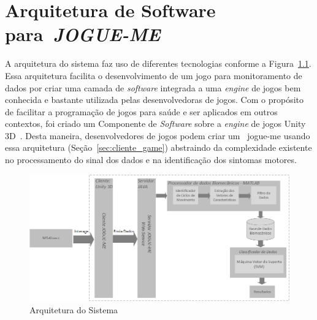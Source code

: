 \chapter{Arquitetura de Software para~\textit{JOGUE-ME}}\label{chapter:arquitetura_captura}

A arquitetura do sistema faz uso de diferentes tecnologias conforme a Figura~\ref{fig:arquitetura}. Essa arquitetura facilita o desenvolvimento de um jogo para monitoramento de dados por criar uma camada de \textit{software} integrada a uma \textit{engine} de jogos bem conhecida e bastante utilizada pelas desenvolvedoras de jogos. Com o propósito de facilitar a programação de jogos para saúde e ser aplicados em outros contextos, foi criado um Componente de \textit{Software} sobre a \textit{engine} de jogos Unity 3D~\cite{unity3d}. Desta maneira, desenvolvedores de jogos podem criar um ~\ac{jogue-me} usando essa arquitetura (Seção~\ref{sec:cliente_game}) abstraindo da complexidade existente no processamento do sinal dos dados e na identificação dos sintomas motores.



\begin{figure}[!htbp]
 \centering
  \includegraphics[scale=0.56]{./img/arquitetura.png}
\caption[Arquitetura do Sistema]{Arquitetura do Sistema}
 \label{fig:arquitetura}
\end{figure}

